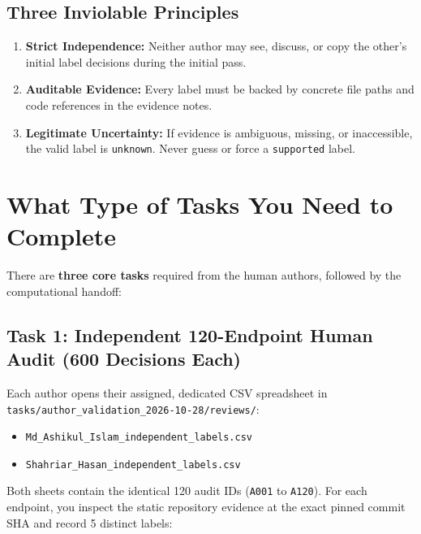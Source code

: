 \documentclass[11pt,a4paper]{article}
\begin{document}
\subsection{Three Inviolable Principles}
\begin{enumerate}
  \item \textbf{Strict Independence:} Neither author may see, discuss, or copy the other's initial label decisions during the initial pass.
  \item \textbf{Auditable Evidence:} Every label must be backed by concrete file paths and code references in the evidence notes.
  \item \textbf{Legitimate Uncertainty:} If evidence is ambiguous, missing, or inaccessible, the valid label is \nolinkurl{unknown}. Never guess or force a \nolinkurl{supported} label.
\end{enumerate}

\section{What Type of Tasks You Need to Complete}

There are \textbf{three core tasks} required from the human authors, followed by the computational handoff:

\subsection{Task 1: Independent 120-Endpoint Human Audit (600 Decisions Each)}
Each author opens their assigned, dedicated CSV spreadsheet in \nolinkurl{tasks/author_validation_2026-10-28/reviews/}:
\begin{itemize}
  \item \nolinkurl{Md_Ashikul_Islam_independent_labels.csv}
  \item \nolinkurl{Shahriar_Hasan_independent_labels.csv}
\end{itemize}
Both sheets contain the identical 120 audit IDs (\nolinkurl{A001} to \nolinkurl{A120}). For each endpoint, you inspect the static repository evidence at the exact pinned commit SHA and record 5 distinct labels:
\end{document}
